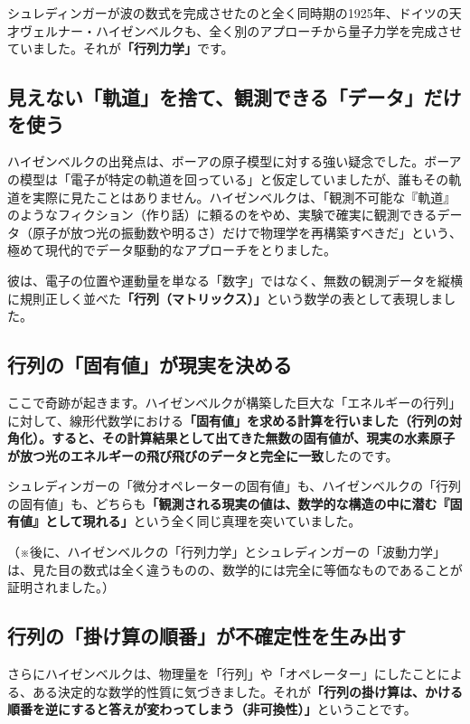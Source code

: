 シュレディンガーが波の数式を完成させたのと全く同時期の1925年、ドイツの天才ヴェルナー・ハイゼンベルクも、全く別のアプローチから量子力学を完成させていました。それが\textbf{「行列力学」}です。

\subsection{見えない「軌道」を捨て、観測できる「データ」だけを使う}

ハイゼンベルクの出発点は、ボーアの原子模型に対する強い疑念でした。ボーアの模型は「電子が特定の軌道を回っている」と仮定していましたが、誰もその軌道を実際に見たことはありません。ハイゼンベルクは、「観測不可能な『軌道』のようなフィクション（作り話）に頼るのをやめ、実験で確実に観測できるデータ（原子が放つ光の振動数や明るさ）だけで物理学を再構築すべきだ」という、極めて現代的でデータ駆動的なアプローチをとりました。

彼は、電子の位置や運動量を単なる「数字」ではなく、無数の観測データを縦横に規則正しく並べた\textbf{「行列（マトリックス）」}という数学の表として表現しました。

\subsection{行列の「固有値」が現実を決める}

ここで奇跡が起きます。ハイゼンベルクが構築した巨大な「エネルギーの行列」に対して、線形代数学における\textbf{「固有値」を求める計算を行いました（行列の対角化）。すると、その計算結果として出てきた無数の固有値が、現実の水素原子が放つ光のエネルギーの飛び飛びのデータと完全に一致}したのです。

シュレディンガーの「微分オペレーターの固有値」も、ハイゼンベルクの「行列の固有値」も、どちらも\textbf{「観測される現実の値は、数学的な構造の中に潜む『固有値』として現れる」}という全く同じ真理を突いていました。

（※後に、ハイゼンベルクの「行列力学」とシュレディンガーの「波動力学」は、見た目の数式は全く違うものの、数学的には完全に等価なものであることが証明されました。）

\subsection{行列の「掛け算の順番」が不確定性を生み出す}

さらにハイゼンベルクは、物理量を「行列」や「オペレーター」にしたことによる、ある決定的な数学的性質に気づきました。それが\textbf{「行列の掛け算は、かける順番を逆にすると答えが変わってしまう（非可換性）」}ということです。

